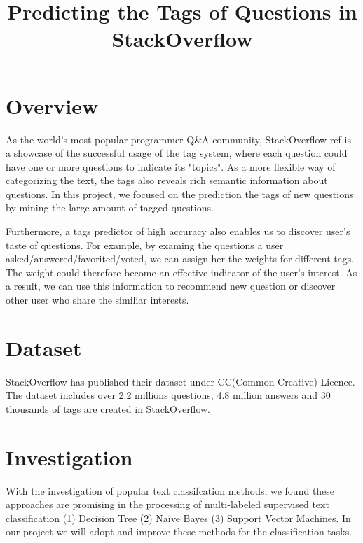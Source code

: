 \documentclass{article} %
\title{Predicting the Tags of Questions in StackOverflow}
\begin{document}
\maketitle
\section{Overview}
As the world's most popular programmer Q\&A community, StackOverflow {ref} is a showcase of the successful usage of the tag system, where each question could have one or more questions to indicate its "topics". As a more flexible way of categorizing the text, the tags also reveals rich semantic information about questions. In this project, we focused on the prediction the tags of new questions by mining the large amount of tagged questions.

Furthermore, a tags predictor of high accuracy also enables us to discover user's taste of questions. For example, by examing the questions a user asked/answered/favorited/voted, we can assign her the weights for different tags. The weight could therefore become an effective indicator of the user's interest. As a result, we can use this information to recommend new question or discover other user who share the similiar interests.

\section{Dataset}
StackOverflow has published their dataset under CC(Common Creative) Licence. The dataset includes over 2.2 millions questions, 4.8 million answers and 30 thousands of tags are created in StackOverflow.

\section{Investigation}
With the investigation of popular text classifcation methods, we found these approaches are promising in the processing of multi-labeled supervised text classification (1) Decision Tree (2) Naïve Bayes (3) Support Vector Machines. In our project we will adopt and improve these methods for the classification tasks.
\end{document}
